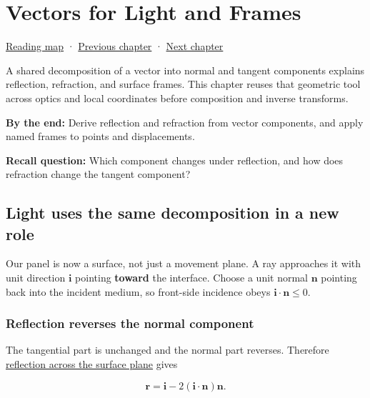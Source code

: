 \hypertarget{01-foundations-i-ch018}{}
\chapter{Vectors for Light and Frames}\label{stagechapter:01-foundations-i-ch018}\label{01-foundations-i-ch018-vectors-for-light-and-frames}

\hyperref[volume-reading-map]{Reading map} · \hyperref[01-foundations-i-ch017-python-and-numerical-tools-for-graphics-systems]{Previous chapter} · \hyperref[01-foundations-i-ch019-coordinate-frames-and-linear-systems]{Next chapter}

A shared decomposition of a vector into normal and tangent components explains reflection, refraction, and surface frames. This chapter reuses that geometric tool across optics and local coordinates before composition and inverse transforms.

\textbf{By the end:} Derive reflection and refraction from vector components, and apply named frames to points and displacements.

\textbf{Recall question:} Which component changes under reflection, and how does refraction change the tangent component?

\section{Light uses the same decomposition in a new role}\label{01-foundations-i-ch018-light-uses-the-same-decomposition-in-a-new-role}

Our panel is now a surface, not just a movement plane. A ray approaches it with unit direction \(\mathbf i\) pointing \textbf{toward} the interface. Choose a unit normal \(\mathbf n\) pointing back into the incident medium, so front-side incidence obeys \(\mathbf i\cdot\mathbf n\le0\).

\subsection{Reflection reverses the normal component}\label{01-foundations-i-ch018-reflection-reverses-the-normal-component}

The tangential part is unchanged and the normal part reverses. Therefore \hyperref[01-foundations-i-ch018-light-uses-the-same-decomposition-in-a-new-role]{reflection across the surface plane} gives

\[
\mathbf r=\mathbf i-2(\mathbf i\cdot\mathbf n)\mathbf n.
\]

